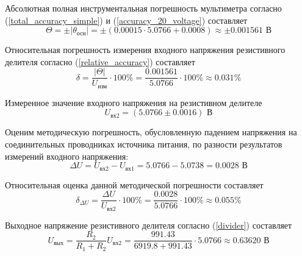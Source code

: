 \documentclass[12pt,a4paper]{article}
\begin{document}
Абсолютная полная инструментальная погрешность мультиметра согласно 
(\ref{total_accuracy_simple}) и (\ref{accuracy_20_voltage}) составляет
\begin{equation*}
	\Theta = \pm \left|\theta_{\text{осн}}\right| = \pm (0.00015 \cdot 5.0766 + 0.0008) \approx \pm 0.001561 \text{ В}
\end{equation*}

Относительная погрешность измерения входного напряжения резистивного делителя согласно (\ref{relative_accuracy}) составляет
\begin{equation*}
\delta = \frac{\left|\Theta\right|}{U_{\text{изм}}} \cdot 100\% = \frac{0.001561}{5.0766} \cdot 100\% \approx 0.031\%
\end{equation*}

Измеренное значение входного напряжения на резистивном делителе
\begin{equation*}
U_{\text{вх2}} = (5.0766 \pm 0.0016) \text{ В}
\end{equation*}

Оценим методическую погрешность, обусловленную падением напряжения на соединительных 
проводниках источника питания, по разности результатов измерений входного напряжения:
\begin{equation*}
\Delta U = U_{\text{вх2}} - U_{\text{вх1}} = 5.0766 - 5.0738 = 0.0028 \text{ В}
\end{equation*}

Относительная оценка данной методической погрешности составляет
\begin{equation*}
\delta_{\Delta U} = \frac{\Delta U}{U_{\text{вх2}}} \cdot 100\% = \frac{0.0028}{5.0766} \cdot 100\% \approx 0.055\%
\end{equation*}

Выходное напряжение резистивного делителя согласно (\ref{divider}) составляет
\begin{equation*}
U_{\text{вых}} = \frac{R_2}{R_1 + R_2} U_{\text{вх2}} = \frac{991.43}{6919.8 + 991.43} \cdot 5.0766 \approx 0.63620 \text{ В}
\end{equation*}
\end{document}

